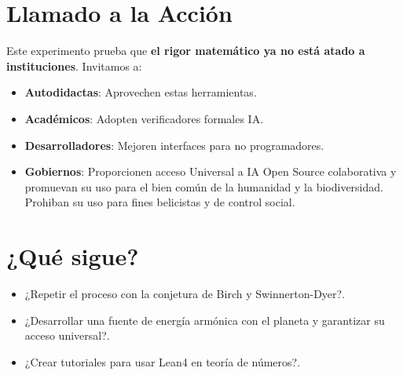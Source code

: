 \documentclass[12pt, a4paper]{article}
\begin{document}
\section{Llamado a la Acción}
Este experimento prueba que \textbf{el rigor matemático ya no está atado a instituciones}. Invitamos a:
\begin{itemize}
\item \textbf{Autodidactas}: Aprovechen estas herramientas.
\item \textbf{Académicos}: Adopten verificadores formales IA.
\item \textbf{Desarrolladores}: Mejoren interfaces para no programadores.
\item \textbf{Gobiernos}: Proporcionen acceso Universal a IA Open Source colaborativa y promuevan su uso para el bien común de la humanidad y la biodiversidad. Prohiban su uso para fines belicistas y de control social.
\end{itemize}

\begin{center}
\end{center}

\section*{¿Qué sigue?}
\begin{itemize}
\item ¿Repetir el proceso con la conjetura de Birch y Swinnerton-Dyer?.
\item ¿Desarrollar una fuente de energía armónica con el planeta y garantizar su acceso universal?.
\item ¿Crear tutoriales para usar Lean4 en teoría de números?.
\end{itemize}

\printbibliography
\end{document}
